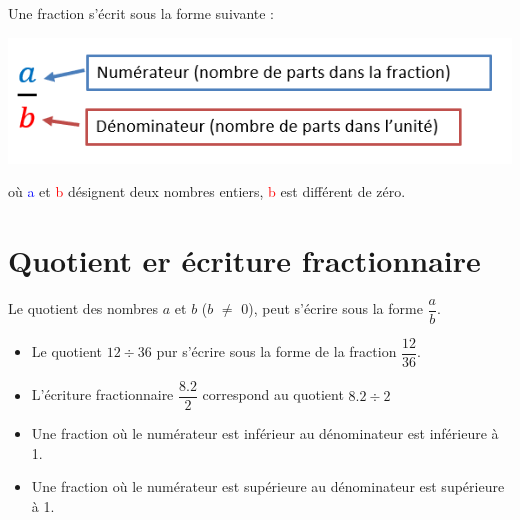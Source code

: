 \documentclass[12pt,a4paper]{article}
\begin{document}
\begin{mydef}
	Une fraction s'écrit sous la forme suivante :
	
	\begin{center}
		\includegraphics[scale=0.7]{definition}
	\end{center}
	
	où \textcolor{blue}{a} et \textcolor{red}{b} désignent deux nombres entiers, \textcolor{red}{b} est différent de zéro.
\end{mydef}

\section{Quotient er écriture fractionnaire}

	\begin{mydef}
		Le quotient des nombres $a$ et $b$ ($b$ $\neq$ 0), peut s'écrire sous la forme $\dfrac{a}{b}$.
	\end{mydef}

	\begin{myexs}
		\begin{itemize}
			\item  Le quotient $12 \div 36$ pur s'écrire sous la forme de la fraction $\dfrac{12}{36}$.
			
			\item L'écriture fractionnaire $\dfrac{\num{8,2}}{2}$ correspond au quotient $\num{8,2} \div 2$
		\end{itemize}
	\end{myexs}

	\begin{myprops}
		
		\begin{itemize}
			\item Une fraction où le numérateur est inférieur au dénominateur est inférieure à 1. 
			\item Une fraction où le numérateur est supérieure au dénominateur est supérieure à 1.
		\end{itemize}
	\end{myprops}
\end{document}
